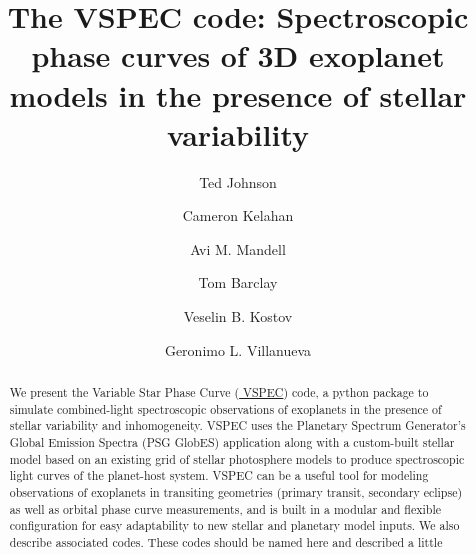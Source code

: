 \documentclass[twocolumn]{aastex631}
\newcommand{\TJ}[1]{\textcolor{tedcommentcolor}{#1}}
\begin{document}
\title{The {\sc VSPEC} code: Spectroscopic phase curves of 3D exoplanet models in the presence of stellar variability}

\author{Ted Johnson}

\author{Cameron Kelahan}

\author{Avi M. Mandell}

\author{Tom Barclay}

\author{Veselin B. Kostov}

\author{Geronimo L. Villanueva}

\begin{abstract}
    We present the Variable Star Phase Curve (\href{https://github.com/VSPEC-collab/VSPEC}{ \sc VSPEC}) code,
    a python package to simulate combined-light spectroscopic observations of exoplanets in the presence of stellar variability and inhomogeneity.
    {\sc VSPEC} uses the Planetary Spectrum Generator's Global Emission Spectra (PSG GlobES) application along with a custom-built
    stellar model based on an existing grid of stellar photosphere models to produce spectroscopic light curves of the planet-host system.
    VSPEC can be a useful tool for modeling observations of exoplanets in transiting geometries (primary transit, secondary eclipse) as well as orbital phase curve measurements,
    and is built in a modular and flexible configuration for easy adaptability to new stellar and planetary model inputs.
    We also describe associated codes. \TJ{These codes should be named here and described a little}
\end{abstract}
\end{document}
